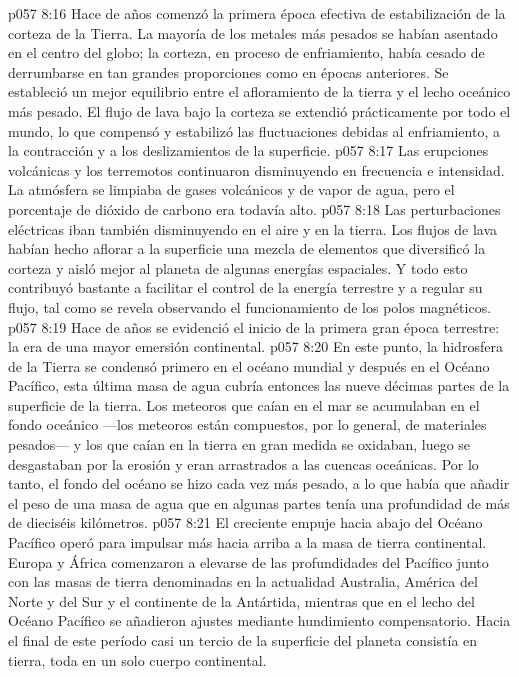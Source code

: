 \vs p057 8:16 \pc Hace  de años comenzó la primera época efectiva de estabilización de la corteza de la Tierra. La mayoría de los metales más pesados se habían asentado en el centro del globo; la corteza, en proceso de enfriamiento, había cesado de derrumbarse en tan grandes proporciones como en épocas anteriores. Se estableció un mejor equilibrio entre el afloramiento de la tierra y el lecho oceánico más pesado. El flujo de lava bajo la corteza se extendió prácticamente por todo el mundo, lo que compensó y estabilizó las fluctuaciones debidas al enfriamiento, a la contracción y a los deslizamientos de la superficie.
\vs p057 8:17 Las erupciones volcánicas y los terremotos continuaron disminuyendo en frecuencia e intensidad. La atmósfera se limpiaba de gases volcánicos y de vapor de agua, pero el porcentaje de dióxido de carbono era todavía alto.
\vs p057 8:18 Las perturbaciones eléctricas iban también disminuyendo en el aire y en la tierra. Los flujos de lava habían hecho aflorar a la superficie una mezcla de elementos que diversificó la corteza y aisló mejor al planeta de algunas energías espaciales. Y todo esto contribuyó bastante a facilitar el control de la energía terrestre y a regular su flujo, tal como se revela observando el funcionamiento de los polos magnéticos.
\vs p057 8:19 \pc Hace  de años se evidenció el inicio de la primera gran época terrestre: la era de una mayor emersión continental.
\vs p057 8:20 En este punto, la hidrosfera de la Tierra se condensó primero en el océano mundial y después en el Océano Pacífico, esta última masa de agua cubría entonces las nueve décimas partes de la superficie de la tierra. Los meteoros que caían en el mar se acumulaban en el fondo oceánico ---los meteoros están compuestos, por lo general, de materiales pesados--- y los que caían en la tierra en gran medida se oxidaban, luego se desgastaban por la erosión y eran arrastrados a las cuencas oceánicas. Por lo tanto, el fondo del océano se hizo cada vez más pesado, a lo que había que añadir el peso de una masa de agua que en algunas partes tenía una profundidad de más de dieciséis kilómetros.
\vs p057 8:21 El creciente empuje hacia abajo del Océano Pacífico operó para impulsar más hacia arriba a la masa de tierra continental. Europa y África comenzaron a elevarse de las profundidades del Pacífico junto con las masas de tierra denominadas en la actualidad Australia, América del Norte y del Sur y el continente de la Antártida, mientras que en el lecho del Océano Pacífico se añadieron ajustes mediante hundimiento compensatorio. Hacia el final de este período casi un tercio de la superficie del planeta consistía en tierra, toda en un solo cuerpo continental.
